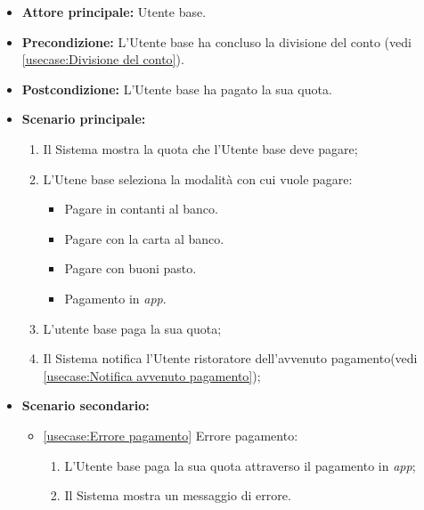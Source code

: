 \label{usecase:Pagamento del conto}
\begin{itemize}
	\item \textbf{Attore principale:} Utente base.

	\item \textbf{Precondizione:} L'Utente base ha concluso la divisione del conto (vedi \autoref{usecase:Divisione del conto}).

	\item \textbf{Postcondizione:} L'Utente base ha pagato la sua quota.

	\item \textbf{Scenario principale:}
            \begin{enumerate}
                \item Il Sistema mostra la quota che l'Utente base deve pagare;
                \item L'Utene base seleziona la modalità con cui vuole pagare:
                \begin{itemize}
                    \item Pagare in contanti al banco.
                    \item Pagare con la carta al banco.
                    \item Pagare con buoni pasto.
                    \item Pagamento in \textit{app}.
                \end{itemize}
				\item L'utente base paga la sua quota;
				\item Il Sistema notifica l'Utente ristoratore dell'avvenuto pagamento(vedi \autoref{usecase:Notifica avvenuto pagamento});
	      \end{enumerate}

    \item \textbf{Scenario secondario:}
		  \begin{itemize}
			  \item \autoref{usecase:Errore pagamento} Errore pagamento:
				\begin{enumerate}
					\item L'Utente base paga la sua quota attraverso il pagamento in \textit{app};
	
					\item  Il Sistema mostra un messaggio di errore.
				\end{enumerate}
		  \end{itemize}
\end{itemize}